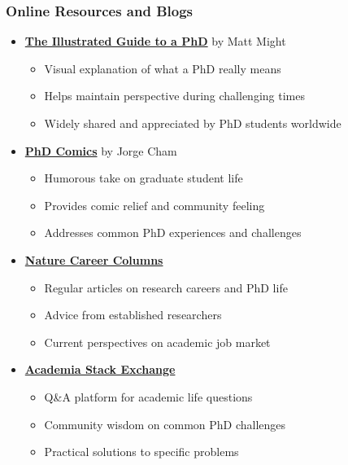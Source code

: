 \documentclass[11pt,a4paper]{article}
\begin{document}
\subsubsection{Online Resources and Blogs}

\begin{itemize}
    \item \textbf{\href{https://matt.might.net/articles/phd-school-in-pictures/}{The Illustrated Guide to a PhD}} by Matt Might
    \begin{itemize}
        \item Visual explanation of what a PhD really means
        \item Helps maintain perspective during challenging times
        \item Widely shared and appreciated by PhD students worldwide
    \end{itemize}
    
    \item \textbf{\href{https://phdcomics.com/}{PhD Comics}} by Jorge Cham
    \begin{itemize}
        \item Humorous take on graduate student life
        \item Provides comic relief and community feeling
        \item Addresses common PhD experiences and challenges
    \end{itemize}
    
    \item \textbf{\href{https://www.nature.com/nature/articles?type=career-column}{Nature Career Columns}}
    \begin{itemize}
        \item Regular articles on research careers and PhD life
        \item Advice from established researchers
        \item Current perspectives on academic job market
    \end{itemize}
    
    \item \textbf{\href{https://academia.stackexchange.com/}{Academia Stack Exchange}}
    \begin{itemize}
        \item Q\&A platform for academic life questions
        \item Community wisdom on common PhD challenges
        \item Practical solutions to specific problems
    \end{itemize}
\end{itemize}
\end{document}
